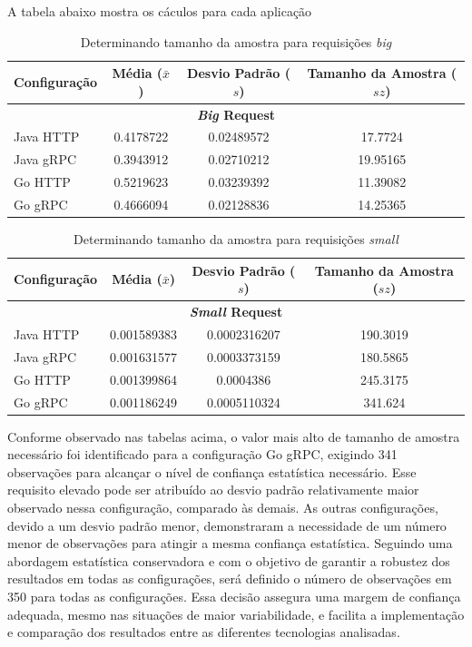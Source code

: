 A tabela abaixo mostra os cáculos para cada aplicação
\begin{table}[h]
\centering
\begin{tabular}{lccc}
\hline
\textbf{Configuração} & \textbf{Média (\(\bar{x}\))} & \textbf{Desvio Padrão (\(s\))} & \textbf{Tamanho da Amostra (\(sz\))} \\
\hline
\multicolumn{4}{c}{\textbf{\textit{Big} Request}} \\
\hline
Java HTTP & 0.4178722 & 0.02489572 & 17.7724 \\
Java gRPC & 0.3943912 & 0.02710212 & 19.95165 \\
Go HTTP & 0.5219623 & 0.03239392 & 11.39082 \\
Go gRPC & 0.4666094 & 0.02128836 & 14.25365 \\
\hline
\end{tabular}
\caption{Determinando tamanho da amostra para requisições \textit{big}}
\label{tab:performance_big}
\end{table}

\begin{table}[h]
\centering
\begin{tabular}{lccc}
\hline
\textbf{Configuração} & \textbf{Média (\(\bar{x}\))} & \textbf{Desvio Padrão (\(s\))} & \textbf{Tamanho da Amostra (\(sz\))} \\
\hline
\multicolumn{4}{c}{\textbf{\textit{Small} Request}} \\
\hline
Java HTTP & 0.001589383 & 0.0002316207 & 190.3019 \\
Java gRPC & 0.001631577 & 0.0003373159 & 180.5865 \\
Go HTTP & 0.001399864 & 0.0004386 & 245.3175 \\
Go gRPC & 0.001186249 & 0.0005110324 & 341.624 \\
\hline
\end{tabular}
\caption{Determinando tamanho da amostra para requisições \textit{small}}
\label{tab:performance_small}
\end{table}

Conforme observado nas tabelas acima, o valor mais alto de tamanho de amostra necessário foi identificado para a configuração Go gRPC, exigindo 341 observações para alcançar o nível de confiança estatística necessário.
Esse requisito elevado pode ser atribuído ao desvio padrão relativamente maior observado nessa configuração, comparado às demais.
As outras configurações, devido a um desvio padrão menor, demonstraram a necessidade de um número menor de observações para atingir a mesma confiança estatística.
Seguindo uma abordagem estatística conservadora e com o objetivo de garantir a robustez dos resultados em todas as configurações, será definido o número de observações em 350 para todas as configurações.
Essa decisão assegura uma margem de confiança adequada, mesmo nas situações de maior variabilidade, e facilita a implementação e comparação dos resultados entre as diferentes tecnologias analisadas.

